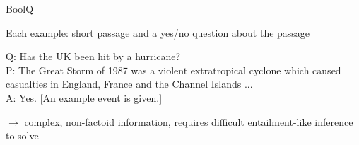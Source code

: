 \documentclass[12pt,aspectratio=169,handout]{beamer}
\begin{document}
\begin{frame}{BoolQ}
	
Each example: short passage and a yes/no question about the passage

\begin{example}
Q: Has the UK been hit by a hurricane? \\
P: The Great Storm of 1987 was a violent extratropical cyclone which caused casualties in England, France and the Channel Islands ... \\
A: Yes. [An example event is given.]
\end{example}
	
$\to$ complex, non-factoid information, requires difficult entailment-like inference to solve


\end{frame}


%
%
%
%
%
%
\end{document}
